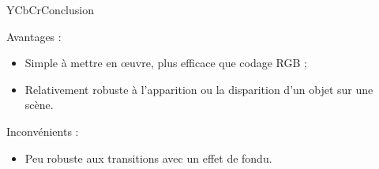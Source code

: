 \begin{frame}{YCbCr}{Conclusion}

\begin{block}{Avantages :}

\begin{itemize}
    \item Simple à mettre en œuvre, plus efficace que codage RGB ;
    \item Relativement robuste à l'apparition ou la disparition d'un objet sur une scène.
\end{itemize}

\end{block}

\begin{block}{Inconvénients :}

\begin{itemize}
    \item Peu robuste aux transitions avec un effet de fondu.
\end{itemize}

\end{block}

\end{frame}

